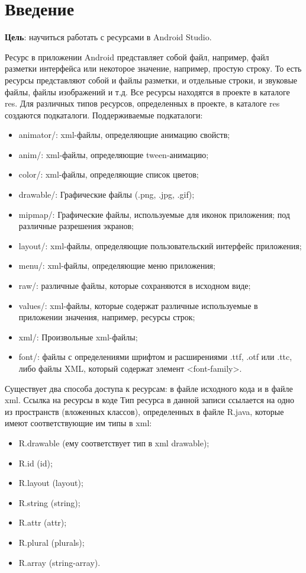 \graphicspath{{./img}}

\section*{\LARGE{Введение}}
\textbf{Цель}: научиться работать с ресурсами в Android Studio.\par
Ресурс в приложении Android представляет собой файл, например, файл
разметки интерфейса или некоторое значение, например, простую строку. То
есть ресурсы представляют собой и файлы разметки, и отдельные строки, и
звуковые файлы, файлы изображений и т.д. Все ресурсы находятся в проекте
в каталоге res. Для различных типов ресурсов, определенных в проекте, в
каталоге res создаются подкаталоги. Поддерживаемые подкаталоги:

\begin{itemize}
	\item animator/: xml-файлы, определяющие анимацию свойств;
	\item anim/: xml-файлы, определяющие tween-анимацию;
	\item color/: xml-файлы, определяющие список цветов;
	\item drawable/: Графические файлы (.png, .jpg, .gif);
	\item mipmap/: Графические файлы, используемые для иконок приложения;
		под различные разрешения экранов;
	\item layout/: xml-файлы, определяющие пользовательский интерфейс
		приложения;
	\item menu/: xml-файлы, определяющие меню приложения;
	\item raw/: различные файлы, которые сохраняются в исходном виде;
	\item values/: xml-файлы, которые содержат различные используемые в
		приложении значения, например, ресурсы строк;
	\item xml/: Произвольные xml-файлы;
	\item font/: файлы с определениями шрифтом и расширениями .ttf, .otf или
		.ttc, либо файлы XML, который содержат элемент <font-family>.
\end{itemize}

Существует два способа доступа к ресурсам: в файле исходного кода и в
файле xml.
Ссылка на ресурсы в коде
Тип ресурса в данной записи ссылается на одно из пространств (вложенных
классов), определенных в файле R.java, которые имеют соответствующие им
типы в xml:

\begin{itemize}
	\item R.drawable (ему соответствует тип в xml drawable);
	\item R.id (id);
	\item R.layout (layout);
	\item R.string (string);
	\item R.attr (attr);
	\item R.plural (plurals);
	\item R.array (string-array).
\end{itemize}

